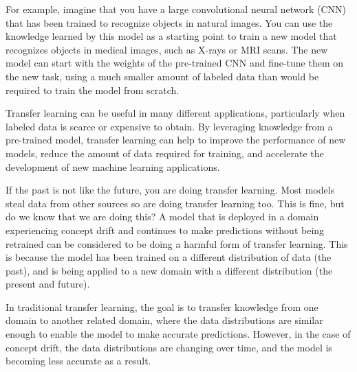 For example, imagine that you have a large convolutional neural network (CNN) that has been trained to recognize objects in natural images. You can use the knowledge learned by this model as a starting point to train a new model that recognizes objects in medical images, such as X-rays or MRI scans. The new model can start with the weights of the pre-trained CNN and fine-tune them on the new task, using a much smaller amount of labeled data than would be required to train the model from scratch.

Transfer learning can be useful in many different applications, particularly when labeled data is scarce or expensive to obtain. By leveraging knowledge from a pre-trained model, transfer learning can help to improve the performance of new models, reduce the amount of data required for training, and accelerate the development of new machine learning applications.

If the past is not like the future, you are doing transfer learning. Most models steal data from other sources so are doing transfer learning too. This is fine, but do we know that we are doing this? A model that is deployed in a domain experiencing concept drift and continues to make predictions without being retrained can be considered to be doing a harmful form of transfer learning. This is because the model has been trained on a different distribution of data (the past), and is being applied to a new domain with a different distribution (the present and future).

In traditional transfer learning, the goal is to transfer knowledge from one domain to another related domain, where the data distributions are similar enough to enable the model to make accurate predictions. However, in the case of concept drift, the data distributions are changing over time, and the model is becoming less accurate as a result. 

